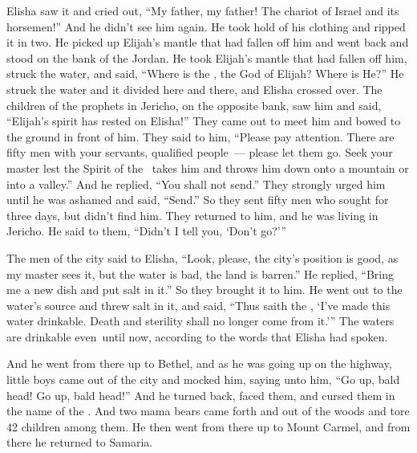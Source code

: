 \begin{inparaenum}
   Elisha saw it and cried out, ``My father, my father! The chariot of Israel and its horsemen!'' And he didn't see him again. He took hold of his clothing and ripped it in two.%
   He picked up Elijah's mantle that had fallen off him and went back and stood on the bank of the Jordan.%
   He took Elijah's mantle that had fallen off him, struck the water, and said, ``Where is the \lord, the God of Elijah? Where is He?'' He struck the water and it divided here and there, and Elisha crossed over.%
   The children of the prophets in Jericho, on the opposite bank, saw him and said, ``Elijah's spirit has rested on Elisha!'' They came out to meet him and bowed to the ground in front of him.%
   They said to him, ``Please pay attention. There are fifty men with your servants, qualified people~--- please let them go. Seek your master lest the Spirit of the \lord\ takes him and throws him down onto a mountain or into a valley.'' And he replied, ``You shall not send.''%
   They strongly urged him until he was ashamed and said, ``Send.'' So they sent fifty men who sought for three days, but didn't find him.%
   They returned to him, and he was living in Jericho. He said to them, ``Didn't I tell you, `Don't go?'\thinspace''%
  
   The men of the city said to Elisha, ``Look, please, the city's position is good, as my master sees it, but the water is bad, the land is barren.''%
   He replied, ``Bring me a new dish and put salt in it.'' So they brought it to him.%
   He went out to the water's source and threw salt in it, and said, ``Thus saith the \lord, `I've made this water drinkable. Death and sterility shall no longer come from it.'\thinspace''%
   The waters are drinkable even\understood\ until now, according to the words that Elisha had spoken.%
  
   And he went from there up to Bethel, and as he was going up on the highway, little boys came out of the city and mocked him, saying unto him, ``Go up, bald head! Go up, bald head!''%
   And he turned back, faced them, and cursed them in the name of the \lord. And two mama bears came forth and out of the woods and tore 42 children among them.%
   He then went from there up to Mount Carmel, and from there he returned to Samaria.%
\end{inparaenum}

